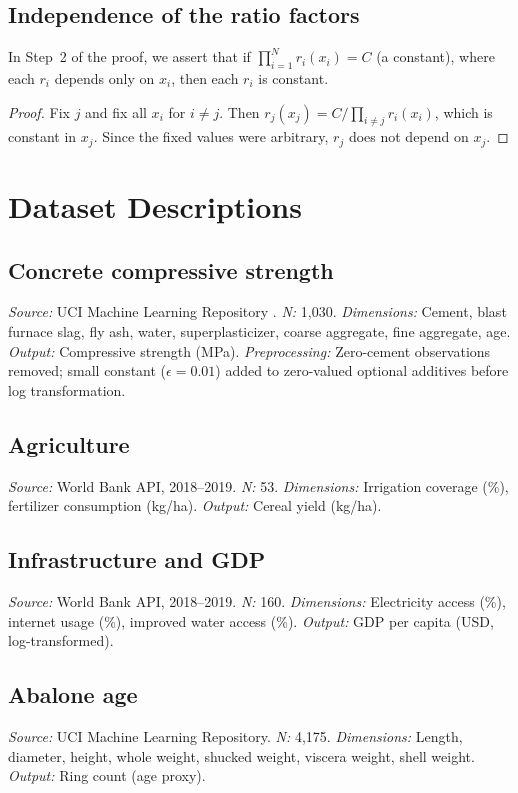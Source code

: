 \documentclass[12pt, a4paper]{article}
\theoremstyle{definition}
\theoremstyle{remark}
\begin{document}
\subsection{Independence of the ratio factors}

In Step~2 of the proof, we assert that if $\prod_{i=1}^{N} r_i(x_i) = C$ (a constant), where each $r_i$ depends only on $x_i$, then each $r_i$ is constant.

\begin{proof}
Fix $j$ and fix all $x_i$ for $i \neq j$. Then $r_j(x_j) = C / \prod_{i \neq j} r_i(x_i)$, which is constant in $x_j$. Since the fixed values were arbitrary, $r_j$ does not depend on $x_j$.
\end{proof}


\section{Dataset Descriptions}\label{app:datasets}

\subsection{Concrete compressive strength}
\textit{Source:} UCI Machine Learning Repository \cite{yeh1998}. \textit{N:} 1,030. \textit{Dimensions:} Cement, blast furnace slag, fly ash, water, superplasticizer, coarse aggregate, fine aggregate, age. \textit{Output:} Compressive strength (MPa). \textit{Preprocessing:} Zero-cement observations removed; small constant ($\epsilon = 0.01$) added to zero-valued optional additives before log transformation.

\subsection{Agriculture}
\textit{Source:} World Bank API, 2018--2019. \textit{N:} 53. \textit{Dimensions:} Irrigation coverage (\%), fertilizer consumption (kg/ha). \textit{Output:} Cereal yield (kg/ha).

\subsection{Infrastructure and GDP}
\textit{Source:} World Bank API, 2018--2019. \textit{N:} 160. \textit{Dimensions:} Electricity access (\%), internet usage (\%), improved water access (\%). \textit{Output:} GDP per capita (USD, log-transformed).

\subsection{Abalone age}
\textit{Source:} UCI Machine Learning Repository. \textit{N:} 4,175. \textit{Dimensions:} Length, diameter, height, whole weight, shucked weight, viscera weight, shell weight. \textit{Output:} Ring count (age proxy).
\end{document}
